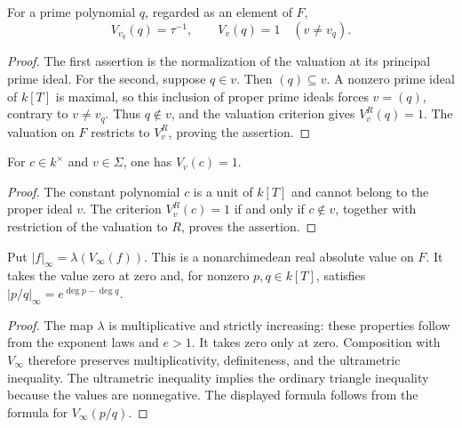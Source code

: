 \begin{lemma}\label{lem:ff-prime-valuations}
\leanok
{}
For a prime polynomial $q$, regarded as an element of $F$,
\[
 V_{v_q}(q)=\tau^{-1},\qquad
 V_v(q)=1\quad(v\ne v_q).
\]
\end{lemma}
\begin{proof}
The first assertion is the normalization of the valuation at its
principal prime ideal. For the second, suppose $q\in v$. Then
$(q)\subseteq v$. A nonzero prime ideal of $k[T]$ is maximal, so this
inclusion of proper prime ideals forces $v=(q)$, contrary to $v\ne v_q$.
Thus $q\notin v$, and the valuation criterion gives $V_v^R(q)=1$.
The valuation on $F$ restricts to $V_v^R$, proving the assertion.
\end{proof}

\begin{lemma}\label{lem:ff-constant-valuation}
\leanok
{}
For $c\in k^\times$ and $v\in\Sigma$, one has $V_v(c)=1$.
\end{lemma}
\begin{proof}
The constant polynomial $c$ is a unit of $k[T]$ and cannot belong to
the proper ideal $v$. The criterion $V_v^R(c)=1$ if and only if
$c\notin v$, together with restriction of the valuation to $R$, proves
the assertion.
\end{proof}

\begin{definition}\label{def:ff-infinity-absolute-value}
\leanok
{}
Put $|f|_\infty=\lambda(V_\infty(f))$. This is a nonarchimedean real
absolute value on $F$. It takes the value zero at zero and, for nonzero
$p,q\in k[T]$, satisfies $|p/q|_\infty=e^{\deg p-\deg q}$.
\end{definition}
\begin{proof}
The map $\lambda$ is multiplicative and strictly increasing: these
properties follow from the exponent laws and $e>1$. It takes zero only
at zero. Composition with $V_\infty$ therefore preserves
multiplicativity, definiteness, and the ultrametric inequality. The
ultrametric inequality implies the ordinary triangle inequality because
the values are nonnegative. The displayed formula follows from the
formula for $V_\infty(p/q)$.
\end{proof}

